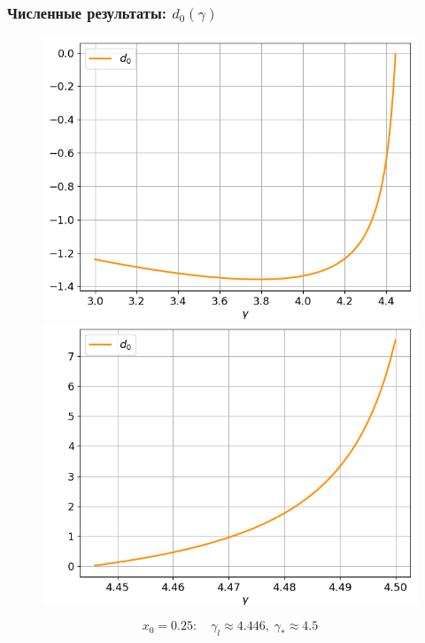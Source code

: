 \documentclass[fullscreen=true, unicode, bookmarks=false]{beamer}
\begin{document}
\begin{frame}
\frametitle{ Численные результаты: $ d_0(\gamma) $ }

\begin{figure} 
\includegraphics[scale=0.37]{divergent_d0_before_14.png}  
\hfill
\includegraphics[scale=0.37]{divergent_d0_after_14.png}  
\end{figure}

$$ x_0 = 0.25: \quad \gamma_l \approx 4.446, \; \gamma_* \approx 4.5 $$

\end{frame}
\end{document}
